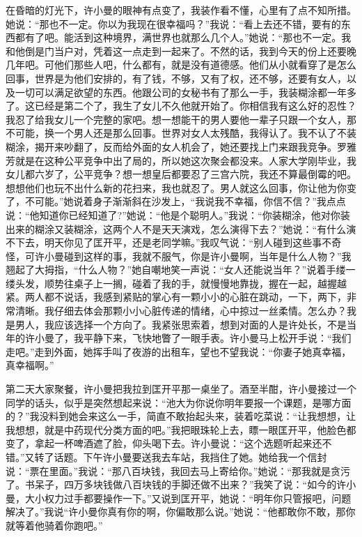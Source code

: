 \documentclass[12pt,oneside]{book}
\begin{document}
在昏暗的灯光下，许小曼的眼神有点变了，我装作看不懂，心里有了点不知所措。她说：``那也不一定。你以为我现在很幸福吗？''我说：``看上去还不错，要有的东西都有了吧。能活到这种境界，满世界也就那么几个人。''她说：``那也不一定。我和他倒是门当户对，凭着这一点走到一起来了。不然的话，我到今天的份上还要晚几年吧。可他们那些人吧，什么都有，就是没有道德感。他们从小就看穿了是怎么回事，世界是为他们安排的，有了钱，不够，又有了权，还不够，还要有女人，以及一切可以满足欲望的东西。他跟公司的女秘书有了那么一手，我装糊涂都一年多了。这已经是第二个了，我生了女儿不久他就开始了。你相信我有这么好的忍性？我忍了给我女儿一个完整的家吧。想一想能干的男人要他一辈子只跟一个女人，那不可能，换一个男人还是那么回事。世界对女人太残酷，我得认了。我不认了不装糊涂，揭开来吵翻了，反而给外面的女人机会了，她还要找上门来跟我竞争。罗雅芳就是在这种公平竞争中出了局的，所以她这次聚会都没来。人家大学刚毕业，我女儿都六岁了，公平竞争？想一想皇后都要忍了三宫六院，我还不算最倒霉的吧。想想他们也玩不出什么新的花扫来，我也就忍了。男人就这么回事，你让他为你变了，不可能。''她说着身子渐渐斜在沙发上，``我说我不幸福，你信不信？''我点点说：``他知道你已经知道了?''她说：``他是个聪明人。''我说：``你装糊涂，他对你装出来的糊涂又装糊涂，这两个人不是天天演戏，怎么演得下去？''她说：``有什么演不下去，明天你见了匡开平，还是老同学嘛。''我叹气说：``别人碰到这些事不奇怪，可许小曼碰到这样的事，我就不服气，你是许小曼啊，当年是什么人物？''我翘起了大拇指，``什么人物？''她自嘲地笑一声说：``女人还能说当年？''说着手缕一缕头发，顺势往桌子上一搁，碰着了我的手，就慢慢地靠拢，握在一起，越握越紧。两人都不说话，我感到紧贴的掌心有一颗小小的心脏在跳动，一下，两下，非常清晰。我仔细去体会那颗小小心脏传递的情绪，心中掠过一丝柔情。怎么办？我是男人，我应该选择一个方向了。我紧张思索着，想到对面的人是许处长，不是当年的许小曼了，我平静下来，飞快地瞥了一眼手表。许小曼马上松开手说：``我们走吧。''走到外面，她挥手叫了夜游的出租车，望也不望我说：``你妻子她真幸福，真幸福啊。''

第二天大家聚餐，许小曼把我拉到匡开平那一桌坐了。酒至半酣，许小曼接过一个同学的话头，似乎是突然想起来说：``池大为你说你明年要报一个课题，是哪方面的？''我没料到她会来这么一手，简直不敢抬起头来，装着吃菜说：``让我想想，让我想想，就是中药现代分类方面的吧。''我把眼珠轮上去，瞟一眼匡开平，他脸色都变了，拿起一杯啤酒遮了脸，仰头喝下去。许小曼说：``这个选题听起来还不错。''又转了话题。下午许小曼要送我去车站，我挡住了她。她给我一个信封说：``票在里面。''我说：``那八百块钱，我回去马上寄给你。''她说：``那我就是贪污了。书呆子，四万多块钱做八百块钱的手脚还做不出来？''我笑了说：``如今的许小曼，大小权力过手都要操作一下。''又说到匡开平，她说：``明年你只管报吧，问题解决了。''我说``许小曼你真有你的啊，你偏敢那么说。''她说：``他都敢你不敢，那你就等着他骑着你跑吧。''
\end{document}
